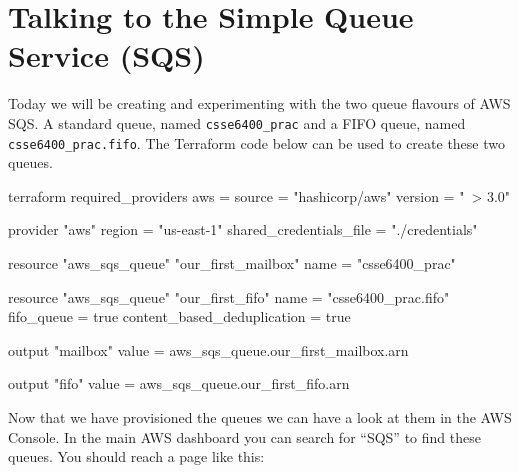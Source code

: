 \documentclass{csse4400}
\begin{document}

\section{Talking to the Simple Queue Service (SQS)}


Today we will be creating and experimenting with the two queue flavours of AWS SQS.
A standard queue, named \texttt{csse6400\_prac} and a FIFO queue, named \texttt{csse6400\_prac.fifo}.
The Terraform code below can be used to create these two queues.



\begin{code}[language=terraform, numbers=none]{}
terraform {
  required_providers {
    aws = {
      source = "hashicorp/aws"
      version = "~> 3.0"
    }
  }
}

provider "aws" {
  region = "us-east-1"
  shared_credentials_file = "./credentials"
}

resource "aws_sqs_queue" "our_first_mailbox" {
  name                        = "csse6400_prac"
}

resource "aws_sqs_queue" "our_first_fifo" {
  name                        = "csse6400_prac.fifo"
  fifo_queue                  = true
  content_based_deduplication = true
}

output "mailbox" {
  value = aws_sqs_queue.our_first_mailbox.arn
}

output "fifo" {
  value = aws_sqs_queue.our_first_fifo.arn
}
\end{code}

Now that we have provisioned the queues we can have a look at them in the AWS Console.
In the main AWS dashboard you can search for ``SQS'' to find these queues.
You should reach a page like this:
\end{document}
